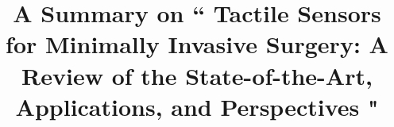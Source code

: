 \documentclass[conference]{IEEEtran}
\begin{document}
\title{A Summary on ``
	Tactile Sensors for Minimally Invasive Surgery: A Review of the State-of-the-Art, Applications, and Perspectives "\\
}
\author{
	}


\maketitle
\end{document}
